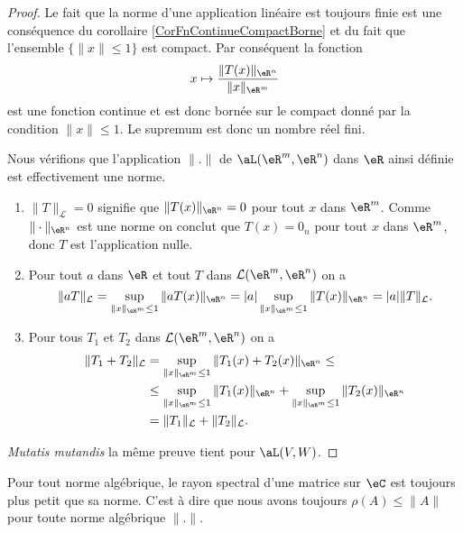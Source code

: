 \begin{proof}
    Le fait que la norme d'une application linéaire est toujours finie est une conséquence du corollaire \ref{CorFnContinueCompactBorne} et du fait que l'ensemble $\{ \| x \|\leq 1 \}$ est compact. Par conséquent la fonction
    \begin{equation}
        x\mapsto \frac{ \| T(x) \|_{\eR^n} }{ \| x \|_{\eR^m} }
    \end{equation}
    est une fonction continue et est donc bornée sur le compact donné par la condition $\| x \|\leq 1$. Le supremum est donc un nombre réel fini.
        
    Nous vérifions que l'application $\| . \|$ de $\aL(\eR^m,\eR^n)$ dans $\eR$ ainsi définie est effectivement une norme.
    \begin{enumerate}
    \item $\|T\|_{\mathcal{L}}=0$ signifie que $\|T(x)\|_{\eR^n}=0$ pour tout $x$ dans $\eR^m$. Comme  $\|\cdot\|_{\eR^n}$ est une norme on conclut que $T(x)=0_{n}$ pour tout $x$ dans $\eR^m$, donc $T$ est l'application nulle. 
    \item Pour tout $a$ dans $\eR$ et tout  $T$ dans $\mathcal{L}(\eR^m, \eR^n)$ on a 
    \[
    \|aT\|_{\mathcal{L}}=\sup_{\|x\|_{\eR^m}\leq 1}\|aT(x)\|_{\eR^n}=|a|\sup_{\|x\|_{\eR^m}\leq 1}\|T(x)\|_{\eR^n}=|a|\|T\|_{\mathcal{L}}.
    \]
    \item Pour tous $T_1$ et $T_2$ dans $\mathcal{L}(\eR^m, \eR^n)$ on a 
      \begin{equation}\nonumber
        \begin{aligned}
           \|T_1+ T_2\|_{\mathcal{L}}&=\sup_{\|x\|_{\eR^m}\leq 1}\|T_1(x)+T_2(x)\|_{\eR^n}\leq\\
     &\leq\sup_{\|x\|_{\eR^m}\leq 1}\|T_1(x)\|_{\eR^n} +\sup_{\|x\|_{\eR^m}\leq 1}\|T_2(x)\|_{\eR^n}\\
     &=\|T_1\|_{\mathcal{L}}+\|T_2\|_{\mathcal{L}}.
        \end{aligned}
      \end{equation}
    \end{enumerate}
    \emph{Mutatis mutandis} la même preuve tient pour $\aL(V,W)$.

\end{proof}

\begin{proposition}
    Pour tout norme algébrique, le rayon spectral d'une matrice sur \( \eC\) est toujours plus petit que sa norme. C'est à dire que nous avons toujours \( \rho(A)\leq \| A \|\) pour toute norme algébrique \( \| . \|\).
\end{proposition}

